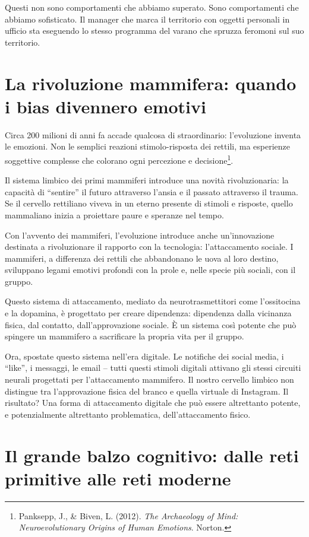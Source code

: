 Questi non sono comportamenti che abbiamo superato. Sono comportamenti che abbiamo sofisticato. Il manager che marca il territorio con oggetti personali in ufficio sta eseguendo lo stesso programma del varano che spruzza feromoni sul suo territorio.

\section{La rivoluzione mammifera: quando i bias divennero emotivi}

Circa 200 milioni di anni fa accade qualcosa di straordinario: l'evoluzione inventa le emozioni. Non le semplici reazioni stimolo-risposta dei rettili, ma esperienze soggettive complesse che colorano ogni percezione e decisione\footnote{Panksepp, J., \& Biven, L. (2012). \textit{The Archaeology of Mind: Neuroevolutionary Origins of Human Emotions}. Norton.}.

Il sistema limbico dei primi mammiferi introduce una novità rivoluzionaria: la capacità di ``sentire'' il futuro attraverso l'ansia e il passato attraverso il trauma. Se il cervello rettiliano viveva in un eterno presente di stimoli e risposte, quello mammaliano inizia a proiettare paure e speranze nel tempo.

Con l'avvento dei mammiferi, l'evoluzione introduce anche un'innovazione destinata a rivoluzionare il rapporto con la tecnologia: l'attaccamento sociale. I mammiferi, a differenza dei rettili che abbandonano le uova al loro destino, sviluppano legami emotivi profondi con la prole e, nelle specie più sociali, con il gruppo.

Questo sistema di attaccamento, mediato da neurotrasmettitori come l'ossitocina e la dopamina, è progettato per creare dipendenza: dipendenza dalla vicinanza fisica, dal contatto, dall'approvazione sociale. È un sistema così potente che può spingere un mammifero a sacrificare la propria vita per il gruppo.

Ora, spostate questo sistema nell'era digitale. Le notifiche dei social media, i ``like'', i messaggi, le email – tutti questi stimoli digitali attivano gli stessi circuiti neurali progettati per l'attaccamento mammifero. Il nostro cervello limbico non distingue tra l'approvazione fisica del branco e quella virtuale di Instagram. Il risultato? Una forma di attaccamento digitale che può essere altrettanto potente, e potenzialmente altrettanto problematica, dell'attaccamento fisico.

\section{Il grande balzo cognitivo: dalle reti primitive alle reti moderne}

